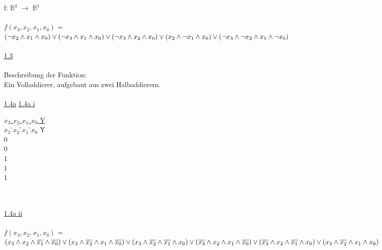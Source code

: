 \documentclass[a4paper,10pt]{scrartcl}
\begin{document}
f: $\mathbb{B}^4$ $\rightarrow$ $\mathbb{B}^1$\\\\
$f(x_{3},x_{2},x_{1},x_{0})$ = \\\( (\lnot x_{2} \land x_{1} \land x_{0}) \lor (\lnot x_{3} \land x_{1} \land x_{0}) \lor (\lnot x_{3} \land x_{2} \land x_{0}) \lor (x_{2} \land \lnot x_{1} \land x_{0}) \\\lor (\lnot x_{3} \land \lnot x_{2} \land x_{1} \land \lnot x_{0})\)\\\\
\newpage
\noindent
\underline{1.3}\\\\
Beschreibung der Funktion:\\
Ein Volladdierer, aufgebaut aus zwei Halbaddierern.\\\\
\underline{1.4a}
\underline{1.4a i}
\begin{tabbing}
\underline{$x_{3}$ $x_{2}$ $x_{1}$ $x_{0}$ Y} \\
$x_{3}$ \=$x_{2}$ \=$x_{1}$ \=$x_{0}$ \=Y     \\
0    \\
0    \\
1    \\
1    \\
1    \\\\\\
\end{tabbing}
\underline{1.4a ii}\\\\
 $f(x_{3},x_{2},x_{1},x_{0})$ = \\ \((x_{3} \land x_{2} \land \overline{x_{1}} \land \overline{x_{0}}) \lor  (x_{3} \land \overline{x_{2}} \land x_{1} \land \overline{x_{0}}) \lor (x_{3} \land \overline{x_{2}} \land \overline{x_{1}} \land x_{0}) \lor\\ (\overline{x_{3}} \land x_{2} \land x_{1} \land \overline{x_{0}}) \lor (\overline{x_{3}} \land x_{2} \land \overline{x_{1}} \land x_{0}) \lor (x_{3} \land \overline{x_{2}} \land x_{1} \land x_{0})\)\\\\
\end{document}
